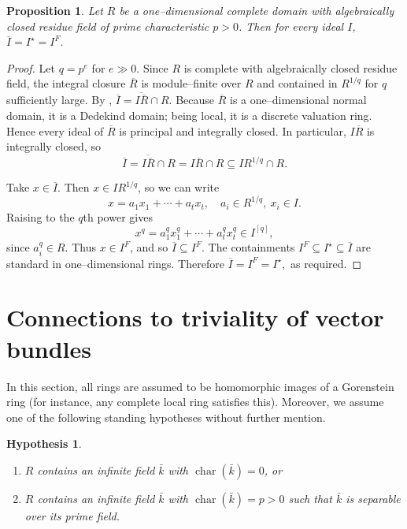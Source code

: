 \documentclass[11pt,a4paper]{amsart}
\numberwithin{equation}{section}
\newtheorem{proposition}[theorem]{Proposition}
\newtheorem{hypothesis}[theorem]{Hypothesis}
\begin{document}
\begin{proposition}\label{612}
	Let $R$ be a one–dimensional complete domain with algebraically closed residue field of prime characteristic $p>0$. Then for every ideal $I$,
	\(
	\overline{I}=I^\star=I^F.
	\)
\end{proposition}

\begin{proof}
	Let $q=p^e$ for $e\gg0$. Since $R$ is complete with algebraically closed residue field, the integral closure $\overline{R}$ is module–finite over $R$ and contained in $R^{1/q}$ for $q$ sufficiently large.
	By \cite[Proposition 1.6.1]{HS},
	\(
	\overline{I}=\overline{I\overline{R}} \cap R.
	\)
	Because $\overline{R}$ is a one–dimensional normal domain, it is a Dedekind domain; being local, it is a discrete valuation ring. Hence every ideal of $\overline{R}$ is principal and integrally closed. In particular, $I\overline{R}$ is integrally closed, so
	\[
	\overline{I}=\overline{I\overline{R}} \cap R
	= I\overline{R} \cap R
	\subseteq IR^{1/q} \cap R.
	\]
	
	Take $x \in \overline{I}$. Then $x \in IR^{1/q}$, so we can write
	\[
	x = a_1 x_1 + \cdots + a_t x_t,
	\quad a_i \in R^{1/q},\ x_i \in I.
	\]
	Raising to the $q$th power gives
	\[
	x^q = a_1^q x_1^q + \cdots + a_t^q x_t^q \in I^{[q]},
	\]
	since $a_i^q \in R$. Thus $x \in I^F$, and so $\overline{I} \subseteq I^F$.
The containments
	\(
	I^F \subseteq I^\star \subseteq \overline{I}
	\)
	are standard in one–dimensional rings. Therefore
	\(
	\overline{I}=I^F=I^\star,
	\)
	as required.
\end{proof}

	\maketitle
	
\section{Connections to triviality of vector bundles}

In this section, all rings are assumed to be homomorphic images of a Gorenstein ring (for instance, any complete local ring satisfies this). Moreover, we assume one of the following standing hypotheses without further mention.

\begin{hypothesis}
	\begin{enumerate}
		\item[(i)] $R$ contains an infinite field $\bar{k}$ with $\operatorname{char}(\bar{k})=0$, or
		\item[(ii)] $R$ contains an infinite field $\bar{k}$ with $\operatorname{char}(\bar{k})=p>0$ such that $\bar{k}$ is separable over its prime field.
	\end{enumerate}
\end{hypothesis}
\end{document}
